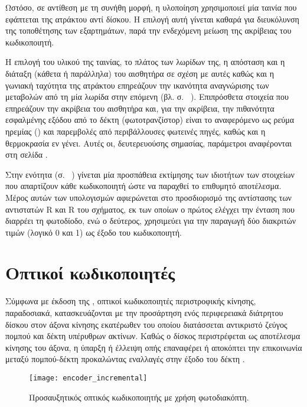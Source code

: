 Ωστόσο, σε αντίθεση με τη συνήθη μορφή, η υλοποίηση χρησιμοποιεί μία ταινία που
εφάπτεται της ατράκτου αντί δίσκου. Η επιλογή αυτή γίνεται καθαρά για
διευκόλυνση της τοποθέτησης των εξαρτημάτων, παρά την ενδεχόμενη μείωση της
ακρίβειας του κωδικοποιητή.

Η επιλογή του υλικού της ταινίας, το πλάτος των λωρίδων της, η απόσταση και η
διάταξη (κάθετα ή παράλληλα) του αισθητήρα σε σχέση με αυτές καθώς και η γωνιακή
ταχύτητα της ατράκτου επηρεάζουν την ικανότητα αναγνώρισης των μεταβολών από τη
μία λωρίδα στην επόμενη (βλ.  σ.~%
\pageref{subsec:reflex:coupling-factor}).
Επιπρόσθετα στοιχεία που επηρεάζουν την ακρίβεια του αισθητήρα και, για την
ακρίβεια, την πιθανότητα εσφαλμένης εξόδου από το δέκτη (φωτοτρανζίστορ) είναι
το αναφερόμενο ως ρεύμα ηρεμίας () και παρεμβολές από
περιβάλλουσες φωτεινές πηγές, καθώς και η θερμοκρασία εν γένει. Αυτές οι,
δευτερευούσης σημασίας, παράμετροι αναφέρονται στη σελίδα
\pageref{subsec:reflex:other-parameters}.

Στην ενότητα  (σ.~%
\pageref{subsec:reflex:calculations}) γίνεται μία προσπάθεια εκτίμησης των
ιδιοτήτων των στοιχείων που απαρτίζουν κάθε κωδικοποιητή ώστε να παραχθεί το
επιθυμητό αποτέλεσμα.
Μέρος αυτών των υπολογισμών αφιερώνεται στο προσδιορισμό της αντίστασης των
αντιστατών R και R του σχήματος, εκ των οποίων ο πρώτος ελέγχει
την ένταση που διαρρέει τη φωτοδίοδο, ενώ ο δεύτερος, χρησιμεύει για την
παραγωγή δύο διακριτών τιμών (λογικό 0 και 1) ως έξοδο του κωδικοποιητή.


\section{Οπτικοί κωδικοποιητές}
\label{sec:encoder:optical}

Σύμφωνα με έκδοση της \textcite[12]{drc76}, οπτικοί κωδικοποιητές περιστροφικής
κίνησης, παραδοσιακά, κατασκευάζονται με την προσάρτηση ενός περιφερειακά
διάτρητου δίσκου στον άξονα κίνησης εκατέρωθεν του οποίου διατάσσεται αντικριστό
ζεύγος πομπού και δέκτη υπέρυθρων ακτίνων. Καθώς ο δίσκος περιστρέφεται ως
αποτέλεσμα κίνησης του άξονα, η ύπαρξη ή έλλειψη οπής επαναφέρει ή αποκόπτει την
επικοινωνία μεταξύ πομπού-δέκτη προκαλώντας εναλλαγές στην έξοδο του δέκτη
\parencite[12]{drc76}.

\begin{figure}
    \caption{Προσαυξητικός οπτικός κωδικοποιητής με χρήση φωτοδιακόπτη.
    \label{fig:encoder:incremental}}
    \begin{center}
    \texttt{[image: encoder\_incremental]}
    \end{center}
\end{figure}

